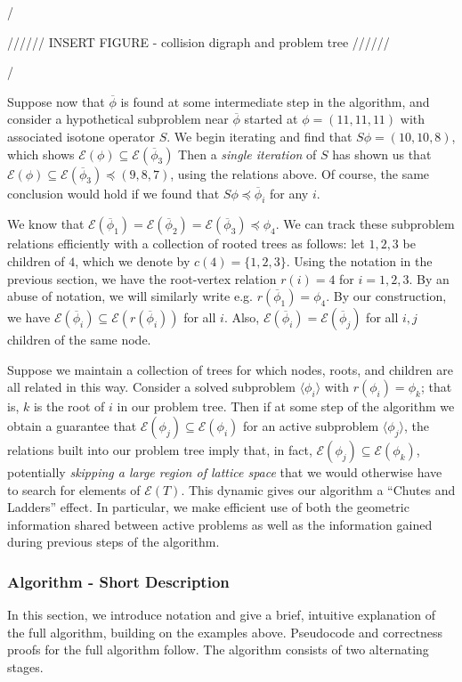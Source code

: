 \documentclass[11pt,reqno]{amsart}
\theoremstyle{definition}
\numberwithin{equation}{section}
\newcommand{\ol}{\overline}
\newcommand{\lag}{\langle}
\newcommand{\rag}{\rangle}
\newcommand{\pre}{\phi}
\newcommand{\sub}{\subseteq}
\newcommand{\fix}{\mathcal{E}}
\newcommand{\peq}{\preceq}
\newcommand{\toppre}{\ol{\pre}}
\begin{document}
/

////// INSERT FIGURE - collision digraph and problem tree //////

/


Suppose now that $\toppre$ is found at some intermediate step in the algorithm, and consider a hypothetical subproblem near $\toppre$ started at $\pre = (11,11,11)$ with associated isotone operator $S$.
We begin iterating and find that $S \pre = (10,10,8)$, which shows $\fix(\pre) \sub \fix(\toppre_3)$ 
Then a \emph{single iteration} of $S$ has shown us that $\fix(\pre) \sub \fix(\toppre_3) \peq (9,8,7)$, using the relations above. 
Of course, the same conclusion would hold if we found that  $S \pre \peq \toppre_i$ for any $i$. 

We know that $\fix(\toppre_1) = \fix(\toppre_2) = \fix(\toppre_3) \peq \pre_4$. 
We can track these subproblem relations efficiently with a collection of rooted trees as follows: let $1,2,3$ be children of $4$, which we denote by $c(4) = \{1,2,3\}$.
Using the notation in the previous section, we have the root-vertex relation $r(i) = 4$ for $i = 1,2,3$. 
By an abuse of notation, we will similarly write e.g. $r(\toppre_1) = \pre_4$. 
By our construction, we have $\fix(\toppre_i) \sub \fix(r(\toppre_i))$ for all $i$. 
Also, $\fix(\toppre_i) = \fix(\toppre_j)$ for all $i,j$ children of the same node. 

Suppose we maintain a collection of trees for which nodes, roots, and children are all related in this way. 
Consider a solved subproblem $\lag \pre_i \rag$ with $r(\pre_i) = \pre_k$; that is, $k$ is the root of $i$ in our problem tree.
Then if at some step of the algorithm we obtain a guarantee that $\fix(\pre_j) \sub \fix(\pre_i)$ for an active subproblem $\lag \pre_j \rag$, the relations built into our problem tree imply that, in fact, $\fix(\pre_j) \sub \fix(\pre_k)$, potentially \emph{skipping a large region of lattice space} that we would otherwise have to search for elements of $\fix(T)$. 
This dynamic gives our algorithm a ``Chutes and Ladders'' effect. 
In particular, we make efficient use of both the geometric information shared between active problems as well as the information gained during previous steps of the algorithm. 

\subsubsection{Algorithm - Short Description} 

In this section, we introduce notation and give a brief, intuitive explanation of the full algorithm, building on the examples above.
Pseudocode and correctness proofs for the full algorithm follow. 
The algorithm consists of two alternating stages. 
\end{document}

